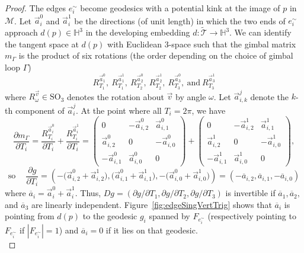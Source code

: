 \documentclass[utopia,fullpage]{nmd/article}
\renewcommand\H{\mathbb H}
\newcommand\mySO[1]{\mathrm{SO}_{#1}}
\newcommand\trig{\mathcal{T}}
\begin{document}
\begin{proof}
The edges $e^\sim_i$ become geodesics with a potential kink at the image of $p$ in $\mathcal{M}$. Let $\overrightarrow{a}_i^0$ and $\overrightarrow{a}_i^1$ be the directions (of unit length) in which the two ends of $e^\sim_i$ approach $d(p)\in\H^3$ in the developing embedding $d:\tilde{\trig}\to\H^3$. We can identify the tangent space at $d(p)$ with Euclidean 3-space such that the gimbal matrix $m_\Gamma$ is the product of six rotations (the order depending on the choice of gimbal loop $\Gamma$)
$$R_{T_1}^{\overrightarrow{a}_1^0},~R_{T_1}^{\overrightarrow{a}_1^1},~R_{T_2}^{\overrightarrow{a}_2^0},~R_{T_2}^{\overrightarrow{a}_2^1},~R_{T_3}^{\overrightarrow{a}_3^0},~\mbox{and}~R_{T_3}^{\overrightarrow{a}_3^1}$$
where $R_\omega^{\overrightarrow{v}}\in\mySO{3}$ denotes the rotation about $\overrightarrow{v}$ by angle $\omega$. Let $\overrightarrow{a}_{i,k}^j$ denote the $k$-th component of $\overrightarrow{a}_i^j$. At the point where all $T_i=2\pi$, we have
$$\frac{\partial m_\Gamma}{\partial T_i} = \frac{R_{T_i}^{\overrightarrow{a}_i^0}}{\partial T_i} + \frac{R_{T_i}^{\overrightarrow{a}_i^1}}{\partial T_i}=
\left(\begin{array}{ccc}
0 & -\overrightarrow{a}_{i,2}^0 & \overrightarrow{a}_{i,1}^0 \\
\overrightarrow{a}_{i,2}^0 & 0 & -\overrightarrow{a}_{i,0}^0 \\
-\overrightarrow{a}_{i,1}^0 & \overrightarrow{a}_{i,0}^0 & 0
\end{array}\right) +
\left(\begin{array}{ccc}
0 & -\overrightarrow{a}_{i,2}^1 & \overrightarrow{a}_{i,1}^1 \\
\overrightarrow{a}_{i,2}^1 & 0 & -\overrightarrow{a}_{i,0}^1 \\
-\overrightarrow{a}_{i,1}^1 & \overrightarrow{a}_{i,0}^1 & 0
\end{array}\right),
$$
$$\mbox{so}~\quad \frac{\partial g}{\partial T_i} = \left(-\big(\overrightarrow{a}_{i,2}^0+\overrightarrow{a}_{i,2}^1\big), \big(\overrightarrow{a}_{i,1}^0+\overrightarrow{a}_{i,1}^1\big), -\big(\overrightarrow{a}_{i,0}^0+\overrightarrow{a}_{i,0}^1\big)\right)=\left(-\overline{a}_{i,2}, \overline{a}_{i,1}, -\overline{a}_{i,0}\right)$$
where $\overline{a}_{i}=\overrightarrow{a}_i^0+\overrightarrow{a}_i^1.$ Thus, $Dg=\left(\partial g/\partial T_1, \partial g/\partial T_2, \partial g/\partial T_3\right)$ is invertible if $\overline{a}_1, \overline{a}_2,$ and $\overline{a}_3$ are linearly independent. Figure~\ref{fig:edgeSingVertTrig} shows that $\overline{a}_i$ is pointing from $d(p)$ to the geodesic $g_i$ spanned by $F_{e^\sim_i}$ (respectively pointing to $F_{e^\sim_i}$ if $|F_{e^\sim_i}|=1$) and $\overline{a}_i=0$ if it lies on that geodesic.\\

\end{proof}
\end{document}
